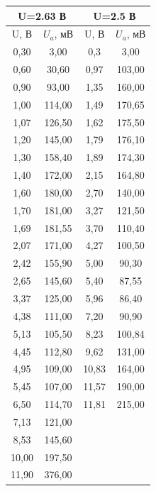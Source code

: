 \documentclass[a4paper,12pt]{article}
\begin{document}
\begin{table}[H]
\centering
\begin{tabular}{|c|c|c|c|}
\hline
\multicolumn{2}{|c|}{U=2.63 В} & \multicolumn{2}{|c|}{U=2.5 В} \\
\hline
U, В & $U_a$, мВ & U, В & $U_a$, мВ \\
\hline
0,30 &	3,00 & 0,3 &	3,00 \\
\hline
0,60 &	30,60 & 0,97	& 103,00 \\
\hline
0,90 &	93,00 & 1,35	& 160,00 \\
\hline
1,00 &	114,00 & 1,49	& 170,65 \\
\hline
1,07 &	126,50 & 1,62	& 175,50 \\
\hline
1,20 &	145,00 & 1,79	& 176,10 \\
\hline
1,30 &	158,40 & 1,89	& 174,30 \\
\hline
1,40 &	172,00 & 2,15	& 164,80 \\
\hline
1,60 &	180,00 & 2,70	& 140,00 \\
\hline
1,70 &	181,00 & 3,27	& 121,50 \\
\hline
1,69 &	181,55 & 3,70	& 110,40 \\
\hline
2,07 &	171,00 & 4,27	& 100,50 \\
\hline
2,42 &	155,90 & 5,00 & 	90,30 \\
\hline
2,65 &	145,60 & 5,40 & 	87,55 \\
\hline
3,37 &	125,00 & 5,96 & 	86,40 \\
\hline
4,38 &	111,00 & 7,20 & 	90,90 \\
\hline
5,13 &	105,50 & 8,23	& 100,84 \\
\hline
4,45 &	112,80 & 9,62	& 131,00 \\
\hline
4,95 &	109,00 & 10,83	& 164,00 \\
\hline
5,45 &	107,00 & 11,57	& 190,00 \\
\hline
6,50 &	114,70 & 11,81	& 215,00 \\
\hline
7,13 &	121,00 & & \\
\hline
8,53 &	145,60 & & \\
\hline
10,00 &	197,50 & & \\
\hline
11,90 &	376,00 & & \\
\hline



\end{tabular}
\end{table}
\end{document}
